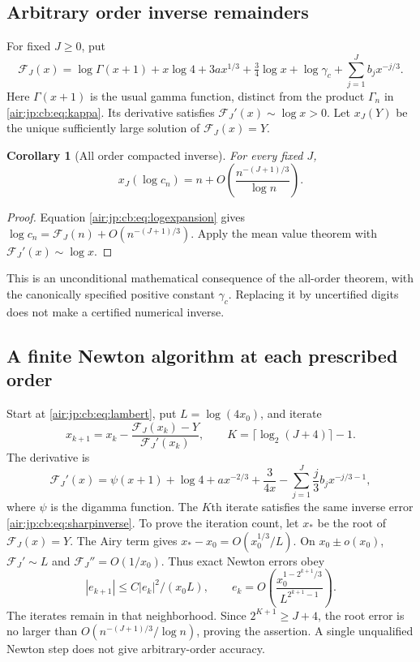 \documentclass[11pt,letterpaper]{article}
\numberwithin{equation}{section}
\newtheorem{corollary}[theorem]{Corollary}
\theoremstyle{remark}
\begin{document}
\subsection{Arbitrary order inverse remainders}
For fixed $J\ge0$, put
\begin{equation}\label{air:jp:cb:eq:FJ}
 \mathcal F_J(x)=\log\Gamma(x+1)+x\log4+3ax^{1/3}+\tfrac34\log x
       +\log\gamma_c+\sum_{j=1}^Jb_jx^{-j/3}.
\end{equation}
Here $\Gamma(x+1)$ is the usual gamma function, distinct from the product $\Gamma_n$ in \eqref{air:jp:cb:eq:kappa}. Its derivative satisfies $\mathcal F_J'(x)\sim\log x>0$. Let $x_J(Y)$ be the unique sufficiently large solution of $\mathcal F_J(x)=Y$.
\begin{corollary}[All order compacted inverse]\label{air:jp:cb:cor:sharpinverse}
For every fixed $J$,
\begin{equation}\label{air:jp:cb:eq:sharpinverse}
 x_J(\log c_n)=n+O\!\left(\frac{n^{-(J+1)/3}}{\log n}\right).
\end{equation}
\end{corollary}
\begin{proof}
Equation \eqref{air:jp:cb:eq:logexpansion} gives $\log c_n=\mathcal F_J(n)+O(n^{-(J+1)/3})$. Apply the mean value theorem with $\mathcal F_J'(x)\sim\log x$.
\end{proof}
This is an unconditional mathematical consequence of the all-order theorem, with the canonically specified positive constant $\gamma_c$. Replacing it by uncertified digits does not make a certified numerical inverse.

\subsection{A finite Newton algorithm at each prescribed order}
Start at \eqref{air:jp:cb:eq:lambert}, put $L=\log(4x_0)$, and iterate
\begin{equation}\label{air:jp:cb:eq:newton}
 x_{k+1}=x_k-\frac{\mathcal F_J(x_k)-Y}{\mathcal F_J'(x_k)},
 \qquad K=\lceil\log_2(J+4)\rceil-1.
\end{equation}
The derivative is
\[
 \mathcal F_J'(x)=\psi(x+1)+\log4+ax^{-2/3}+\frac3{4x}
     -\sum_{j=1}^J\frac j3b_jx^{-j/3-1},
\]
where $\psi$ is the digamma function. The $K$th iterate satisfies the same inverse error \eqref{air:jp:cb:eq:sharpinverse}. To prove the iteration count, let $x_*$ be the root of $\mathcal F_J(x)=Y$. The Airy term gives $x_*-x_0=O(x_0^{1/3}/L)$. On $x_0\pm o(x_0)$, $\mathcal F_J'\sim L$ and $\mathcal F_J''=O(1/x_0)$. Thus exact Newton errors obey
\[
 |e_{k+1}|\le C|e_k|^2/(x_0L),\qquad
 e_k=O\!\left(\frac{x_0^{1-2^{k+1}/3}}{L^{2^{k+1}-1}}\right).
\]
The iterates remain in that neighborhood. Since $2^{K+1}\ge J+4$, the root error is no larger than $O(n^{-(J+1)/3}/\log n)$, proving the assertion. A single unqualified Newton step does not give arbitrary-order accuracy.
\end{document}
